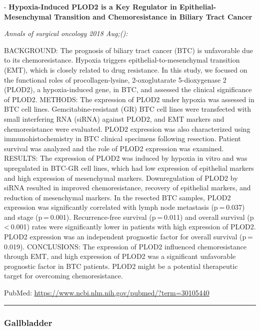 \documentclass[]{article}
\begin{document}
 - \textbf{Hypoxia-Induced PLOD2 is a Key Regulator in
Epithelial-Mesenchymal Transition and Chemoresistance in Biliary Tract
Cancer}

\emph{Annals of surgical oncology 2018 Aug;():}

BACKGROUND: The prognosis of biliary tract cancer (BTC) is unfavorable
due to its chemoresistance. Hypoxia triggers epithelial-to-mesenchymal
transition (EMT), which is closely related to drug resistance. In this
study, we focused on the functional roles of procollagen-lysine,
2-oxoglutarate 5-dioxygenase 2 (PLOD2), a hypoxia-induced gene, in BTC,
and assessed the clinical significance of PLOD2. METHODS: The expression
of PLOD2 under hypoxia was assessed in BTC cell lines.
Gemcitabine-resistant (GR) BTC cell lines were transfected with small
interfering RNA (siRNA) against PLOD2, and EMT markers and
chemoresistance were evaluated. PLOD2 expression was also characterized
using immunohistochemistry in BTC clinical specimens following
resection. Patient survival was analyzed and the role of PLOD2
expression was examined. RESULTS: The expression of PLOD2 was induced by
hypoxia in vitro and was upregulated in BTC-GR cell lines, which had low
expression of epithelial markers and high expression of mesenchymal
markers. Downregulation of PLOD2 by siRNA resulted in improved
chemoresistance, recovery of epithelial markers, and reduction of
mesenchymal markers. In the resected BTC samples, PLOD2 expression was
significantly correlated with lymph node metastasis (p = 0.037) and
stage (p = 0.001). Recurrence-free survival (p = 0.011) and overall
survival (p \textless{} 0.001) rates were significantly lower in
patients with high expression of PLOD2. PLOD2 expression was an
independent prognostic factor for overall survival (p = 0.019).
CONCLUSIONS: The expression of PLOD2 influenced chemoresistance through
EMT, and high expression of PLOD2 was a significant unfavorable
prognostic factor in BTC patients. PLOD2 might be a potential
therapeutic target for overcoming chemoresistance.

PubMed: \url{https://www.ncbi.nlm.nih.gov/pubmed/?term=30105440}

{}

{}

\begin{center}\rule{0.5\linewidth}{\linethickness}\end{center}

\hypertarget{gallbladder-2}{%
\subsubsection{Gallbladder}\label{gallbladder-2}}
\end{document}
